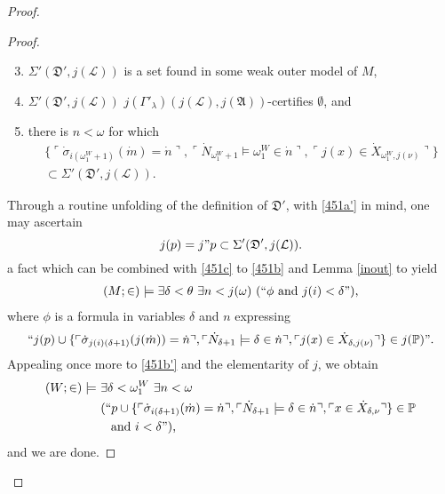 \documentclass[12pt]{article}
\numberwithin{equation}{section}
\begin{document}
\begin{proof}
\begin{proof}
\begin{enumerate}[label=(\alph*)]
    \setcounter{enumi}{2}
    \item\label{451c} $\Sigma'(\mathfrak{D}', j(\mathcal{L}))$ is a set found in some weak outer model of $M$,
    \item\label{451a} $\Sigma'(\mathfrak{D}', j(\mathcal{L}))$ $j(\Gamma'_{\lambda}) (j(\mathcal{L}), j(\mathfrak{A}))$-certifies $\emptyset$, and
    \item\label{451b} there is $n < \omega$ for which 
    \begin{gather*}
        \{\ulcorner \dot{\sigma}_{i(\omega_1^W + 1)}(\dot{m}) = \dot{n} \urcorner, \ulcorner \dot{N}_{\omega_1^W + 1} \models \omega_1^W \in \dot{n} \urcorner, \ulcorner j(x) \in \dot{X}_{\omega_1^W, j(\nu)} \urcorner\} \\
        \subset \Sigma'(\mathfrak{D}', j(\mathcal{L})) \text{.}
    \end{gather*}
\end{enumerate}
Through a routine unfolding of the definition of $\mathfrak{D}'$, with \ref{451a'} in mind, one may ascertain 
\begin{equation*}
    j(p) = j" p \subset \Sigma'(\mathfrak{D}', j(\mathcal{L})) \text{.}
\end{equation*}
a fact which can be combined with \ref{451c} to \ref{451b} and Lemma \ref{inout} to yield
\begin{align*}
    (M; \in) \models \exists \delta < \theta \ \exists n < j(\omega) \ (``\phi \text{ and } j(i) < \delta") \text{,}
\end{align*}
where $\phi$ is a formula in variables $\delta$ and $n$ expressing
\begin{equation*}
    ``j(p) \cup \{\ulcorner \dot{\sigma}_{j(i)(\delta + 1)}(j(\dot{m})) = \dot{n} \urcorner, \ulcorner \dot{N}_{\delta + 1} \models \delta \in \dot{n} \urcorner, \ulcorner j(x) \in \dot{X}_{\delta, j(\nu)} \urcorner\} \in j(\mathbb{P})" \text{.}
\end{equation*}
Appealing once more to \ref{451b'} and the elementarity of $j$, we obtain
\begin{align*}
    (W; \in) \models \ & \exists \delta < \omega_1^W \ \exists n < \omega \\
    & (``p \cup \{\ulcorner \dot{\sigma}_{i(\delta + 1)}(\dot{m}) = \dot{n} \urcorner, \ulcorner \dot{N}_{\delta + 1} \models \delta \in \dot{n} \urcorner, \ulcorner x \in \dot{X}_{\delta, \nu} \urcorner\} \in \mathbb{P} \\
    & \mspace{15mu} \text{and } i < \delta") \text{,}
\end{align*}
and we are done.
\end{proof}


\end{proof}
\end{document}
